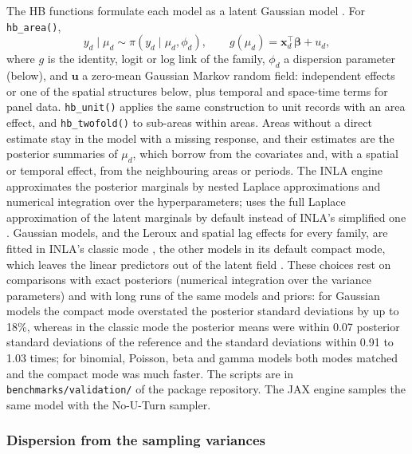 The HB functions formulate each model as a latent Gaussian model \citep{rue2009approximate}. For \texttt{hb\_area()},
\begin{equation}
y_d \mid \mu_d \sim \pi(y_d \mid \mu_d, \phi_d), \qquad g(\mu_d) = \boldsymbol{x}_d^\top\boldsymbol{\beta} + u_d,
\label{eq:lgm}
\end{equation}
where \(g\) is the identity, logit or log link of the family, \(\phi_d\) a dispersion parameter (below), and \(\boldsymbol{u}\) a zero-mean Gaussian Markov random field: independent effects or one of the spatial structures below, plus temporal and space-time terms for panel data. \texttt{hb\_unit()} applies the same construction to unit records with an area effect, and \texttt{hb\_twofold()} to sub-areas within areas. Areas without a direct estimate stay in the model with a missing response, and their estimates are the posterior summaries of \(\mu_d\), which borrow from the covariates and, with a spatial or temporal effect, from the neighbouring areas or periods. The INLA engine approximates the posterior marginals by nested Laplace approximations and numerical integration over the hyperparameters;  uses the full Laplace approximation of the latent marginals by default instead of INLA's simplified one \citep{rue2009approximate}. Gaussian models, and the Leroux and spatial lag effects for every family, are fitted in INLA's classic mode \citep{rue2009approximate}, the other models in its default compact mode, which leaves the linear predictors out of the latent field \citep{vanniekerk2023new}. These choices rest on comparisons with exact posteriors (numerical integration over the variance parameters) and with long  runs of the same models and priors: for Gaussian models the compact mode overstated the posterior standard deviations by up to 18\%, whereas in the classic mode the posterior means were within 0.07 posterior standard deviations of the reference and the standard deviations within 0.91 to 1.03 times; for binomial, Poisson, beta and gamma models both modes matched  and the compact mode was much faster. The scripts are in \texttt{benchmarks/validation/} of the package repository. The JAX engine samples the same model with the No-U-Turn sampler.

\subsubsection{Dispersion from the sampling variances}\label{sec:methods-dispersion}

